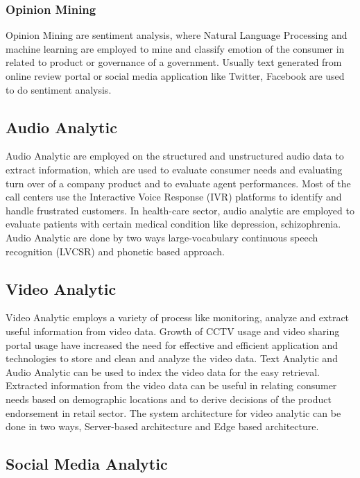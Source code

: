 \documentclass[sigconf]{acmart}
\begin{document}
\subsubsection{Opinion Mining}

Opinion Mining are sentiment analysis, where Natural Language Processing and machine learning are employed to mine and classify emotion of the consumer in related to product or governance of a government. Usually text generated from online review portal or social media application like Twitter, Facebook are used to do sentiment analysis.


\subsection{Audio Analytic}

Audio Analytic are employed on the structured and unstructured audio data to extract information, which are used to evaluate consumer needs and evaluating turn over of a company product and to evaluate agent performances. Most of the call centers use the Interactive Voice Response (IVR)\cite{ivr} platforms to identify and handle frustrated customers. In health-care sector, audio analytic are employed to evaluate patients with certain medical condition like depression, schizophrenia\cite{bigdata}. Audio Analytic are done by two ways large-vocabulary continuous speech recognition (LVCSR)\cite{bigdata} and phonetic based approach\cite{bigdata}.

\subsection{Video Analytic}

Video Analytic employs a variety of process like monitoring, analyze and extract useful information from video data. Growth of CCTV usage and video sharing portal usage have increased the need for effective and efficient application and technologies to store and clean and analyze the video data. Text Analytic and Audio Analytic can be used to index the video data for the easy retrieval. Extracted information from the video data can be useful in relating consumer needs based on demographic locations and to derive decisions of the product endorsement in retail sector. The system architecture for video analytic can be done in two ways, Server-based architecture and Edge based architecture.

\subsection{Social Media Analytic}
\end{document}
